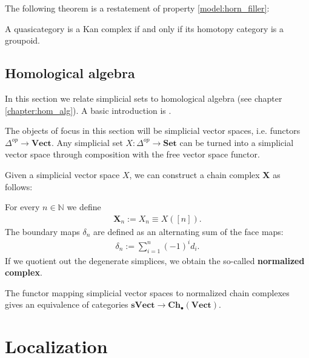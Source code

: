     The following theorem is a restatement of property \ref{model:horn_filler}:
    \begin{theorem}[Joyal]
        A quasicategory is a Kan complex if and only if its homotopy category is a groupoid.
    \end{theorem}

\subsection{Homological algebra}

    In this section we relate simplicial sets to homological algebra (see chapter \ref{chapter:hom_alg}). A basic introduction is \cite{master2020homology}.

    The objects of focus in this section will be simplicial vector spaces, i.e. functors $\Delta^{op}\rightarrow\mathbf{Vect}$. Any simplicial set $X:\Delta^{op}\rightarrow\mathbf{Set}$ can be turned into a simplicial vector space through composition with the free vector space functor.

    Given a simplicial vector space $X$, we can construct a chain complex $\mathbf{X}$ as follows:
    \begin{construct}
        For every $n\in\mathbb{N}$ we define
        \begin{gather}
            \mathbf{X}_n := X_n \equiv X([n]).
        \end{gather}
        The boundary maps $\delta_n$ are defined as an alternating sum of the face maps:
        \begin{gather}
            \delta_n := \sum_{i=1}^n(-1)^id_i.
        \end{gather}
        If we quotient out the degenerate simplices, we obtain the so-called \textbf{normalized complex}.
    \end{construct}
    \begin{theorem}\label{sheaf:dold_kan}
        The functor mapping simplicial vector spaces to normalized chain complexes gives an equivalence of categories $\mathbf{sVect}\rightarrow\mathbf{Ch}_\bullet(\mathbf{Vect})$.
    \end{theorem}

\section{Localization}

